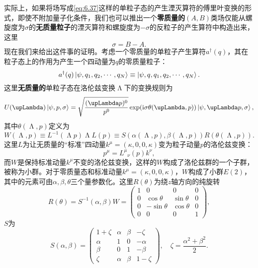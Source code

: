 实际上，如果将场写成\ref{eq:6.37}这样的单粒子态的产生湮灭算符的傅里叶变换的形式，即使不附加量子化条件，我们也可以推出一个\textbf{零质量的}$( A,B)$类场仅能从螺旋度为$\sigma $的\textbf{无质量粒子}的湮灭算符和螺旋度为$-\sigma $的反粒子的产生算符中构造出来\parencite{weinberg1995quantum}，这里
\begin{equation*}
	\sigma =B-A.
\end{equation*}
现在我们来给出这件事的证明。考虑一个零质量的单粒子产生算符$a^{\dagger }( q)$，其在粒子态上的作用为产生一个四动量为$q$的零质量粒子：
\begin{equation}
	a^{\dagger }( q)\ket{\psi ,q_{1} ,q_{2} ,\cdots ,q_{N}} \equiv \ket{\psi ,q,q_{1} ,q_{2} ,\cdots ,q_{N}} .
	\label{eq:6.38}
\end{equation}
这里\textbf{无质量的}单粒子态在洛伦兹变换$\upLambda $下的变换规则为\parencite{weinberg1995quantum}
\begin{equation}
	U( \upLambda )\ket{\psi ,p,\sigma } =\sqrt{\frac{( \upLambda p)^{0}}{p^{0}}}\exp(\mathrm{i} \sigma \theta ( \upLambda ,p))\ket{\psi ,\upLambda p,\sigma } ,
	\label{eq:6.39}
\end{equation}
其中$\displaystyle \theta ( \upLambda ,p)$定义为
\begin{equation*}
	W( \upLambda ,p) \equiv L^{-1}( \upLambda p) \upLambda L( p) \equiv S( \alpha ( \upLambda ,p) ,\beta ( \upLambda ,p)) R( \theta ( \upLambda ,p)) .
\end{equation*}
这里$L$为让无质量的“标准”四动量$\displaystyle k^{\mu } =( \kappa ,0,0,\kappa )$变为粒子动量$p$的洛伦兹变换：
\begin{equation*}
	p^{\mu } =L^{\mu }{}_{\nu }( p) k^{\nu } ,
\end{equation*}
而$W$是保持标准动量$k^{\mu }$不变的洛伦兹变换，这样的$W$构成了洛伦兹群的一个子群，被称为小群。对于零质量态和标准动量$\displaystyle k^{\mu } =( \kappa ,0,0,\kappa )$，$W$构成了小群$E( 2)$，其中的元素可由$\alpha ,\beta ,\theta $三个量参数化。这里$R( \theta )$为绕$\displaystyle z$轴方向的纯旋转
\begin{equation*}
	R( \theta ) =S^{-1}( \alpha ,\beta ) W=\begin{pmatrix}
		1 & 0 & 0 & 0\\
		0 & \cos \theta  & \sin \theta  & 0\\
		0 & -\sin \theta  & \cos \theta  & 0\\
		0 & 0 & 0 & 1
	\end{pmatrix} ,
\end{equation*}
$S$为
\begin{equation*}
	S( \alpha ,\beta ) =\begin{pmatrix}
		1+\zeta  & \alpha  & \beta  & -\zeta \\
		\alpha  & 1 & 0 & -\alpha \\
		\beta  & 0 & 1 & -\beta \\
		\zeta  & \alpha  & \beta  & 1-\zeta 
	\end{pmatrix} ,\quad \zeta =\frac{\alpha ^{2} +\beta ^{2}}{2} .
\end{equation*}


